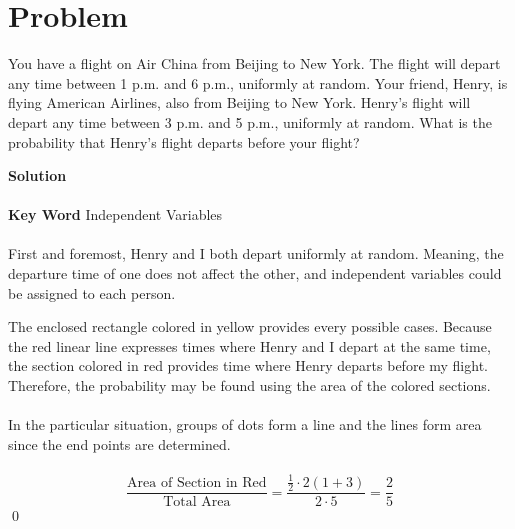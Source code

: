 \documentclass{article}
\newenvironment{solution}{\begin{trivlist}\item[]{\bf Solution}}{\qed \end{trivlist}}
\begin{document}
\section*{Problem}
You have a flight on Air China from Beijing to New York. The flight will depart any time between 1 p.m. and 6 p.m., uniformly at random. Your friend, Henry, is flying American Airlines, also from Beijing to New York. Henry's flight will depart any time between 3 p.m. and 5 p.m., uniformly at random. What is the probability that Henry's flight departs before your flight?
\begin{solution}
\\\\
\textbf{Key Word} Independent Variables
\\\\
First and foremost, Henry and I both depart uniformly at random. Meaning, the departure time of one does not affect the other, and independent variables could be assigned to each person.
\begin{center}
\end{center}
The enclosed rectangle colored in yellow provides every possible cases. Because the red linear line expresses times where Henry and I depart at the same time, the section colored in red provides time where Henry departs before my flight. Therefore, the probability may be found using the area of the colored sections.
\\\\
In the particular situation, groups of dots form a line and the lines form area since the end points are determined.
\\\\
\[
\frac{\text{Area of Section in Red}}{\text{Total Area}}=\frac{\frac{1}{2}\cdot2(1+3)}{2\cdot5}=\boxed{\frac{2}{5}}
\]
\end{solution}
\end{document}
